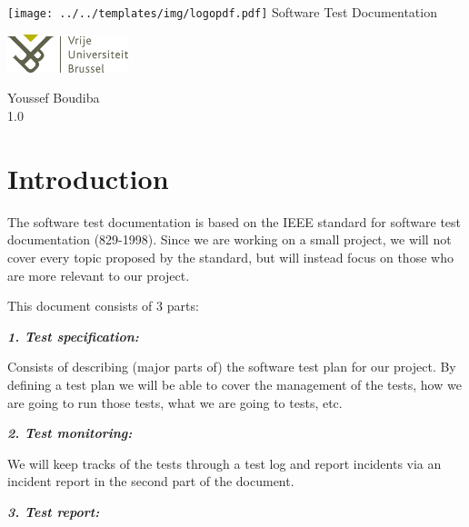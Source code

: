 \documentclass[12pt]{article}
\newcommand{\DocumentName}{Software Test Documentation}
\newcommand{\Title}{\DocumentName \\ \hfill}
\newcommand{\Author}{Youssef Boudiba}
\newcommand{\Version}{1.0}
\begin{document}
\begin{titlepage}

\begin{center}
\texttt{[image: ../../templates/img/logopdf.pdf]}
\vfill
{\Huge \Title}
\hfill
\vfill
\vfill
\end{center}

\begin{minipage}[t]{1\textwidth}
\begin{flushleft}
\includegraphics[width=100pt]{../../templates/img/VUB_logo_compact.jpg}
\end{flushleft}
\end{minipage}

\begin{minipage}[t]{1\textwidth}
\begin{flushright}
\Author \\
\Version \\
\end{flushright}
\end{minipage}

\end{titlepage}
\section{Introduction}\label{introduction}

The software test documentation is based on the IEEE standard for
software test documentation (829-1998). Since we are working on a small
project, we will not cover every topic proposed by the standard, but
will instead focus on those who are more relevant to our project.

This document consists of 3 parts:

\textbf{\emph{1. Test specification:}}

Consists of describing (major parts of) the software test plan for our
project. By defining a test plan we will be able to cover the management
of the tests, how we are going to run those tests, what we are going to
tests, etc.

\textbf{\emph{2. Test monitoring:}}

We will keep tracks of the tests through a test log and report incidents
via an incident report in the second part of the document.

\textbf{\emph{3. Test report:}}
\end{document}
